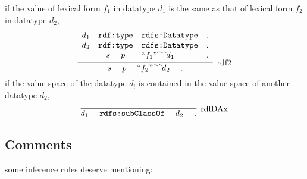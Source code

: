 \documentclass{article}
\DeclareMathOperator{\s}{\phantom{ab}}
\newcommand{\ttri}[3]{#1 \s #2 \s #3 \s.}
\newcommand{\ttp}[2]{\texttt{#1:#2}}
\DeclareMathOperator{\subc}{\ttp{rdfs}{subClassOf}}
\DeclareMathOperator{\type}{\ttp{rdf}{type}}
\begin{document}
\begin{description}
\[\]
\[\]
if the value of lexical form $f_1$ in datatype $d_1$ is the same as that of lexical form $f_2$ in datatype $d_2$, 
\[
\infer[\mathrm{rdf2}]{\ttri{s}{p}{``f_2"\text{\textasciicircum\textasciicircum}d_2}}
{\begin{array}{ccll}
d_1 & \type &  \ttp{rdfs}{Datatype}& .\\
d_2 & \type & \ttp{rdfs}{Datatype}&.\\
 &s\s p & ``f_1"\text{\textasciicircum\textasciicircum}d_1 & .
\end{array}}
\]
\[\]
if the value space of the datatype $d_!$ is contained in the value space of another  datatype $d_2$, 
\[
\infer[\mathrm{rdfDAx}]{\ttri{d_1}{\subc}{d_2}}{}
\]
\end{description}

\subsection{Comments}
 some inference rules deserve mentioning:
\end{document}

